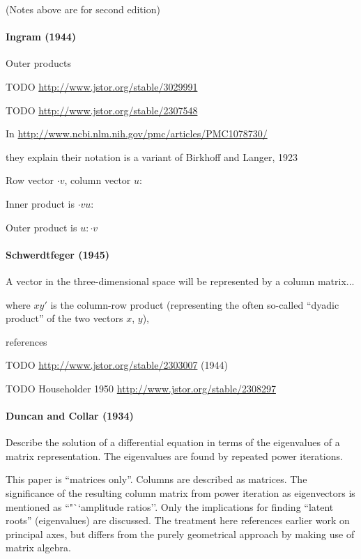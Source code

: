(Notes above are for second edition)



\paragraph{Ingram (1944)}

Outer products

TODO \url{http://www.jstor.org/stable/3029991}

TODO \url{http://www.jstor.org/stable/2307548}

In
\url{http://www.ncbi.nlm.nih.gov/pmc/articles/PMC1078730/}

they explain their notation is a variant of Birkhoff and Langer, 1923

Row vector $\cdot v$, column vector $u:$

Inner product is $\cdot v u:$

Outer product is $u:\cdot v$



\paragraph{Schwerdtfeger (1945)~\cite{Schwerdtfeger1945}}

A vector in the three-dimensional space will
be represented by a column matrix...

where $xy'$ is the column-row product (representing
the often so-called ``dyadic product'' of the
two vectors $x$, $y$),

references \cite{Schwerdtfeger1938,Murnaghan1938,Pipes1937}

TODO \url{http://www.jstor.org/stable/2303007} (1944)

TODO Householder 1950 \url{http://www.jstor.org/stable/2308297}

\paragraph{Duncan and Collar (1934)\cite{Duncan1934}}

Describe the solution of a differential equation in terms of the eigenvalues of
a matrix representation. The eigenvalues are found by repeated power iterations.

This paper is ``matrices only''. Columns are described as matrices.
The significance of the resulting column matrix from power iteration as
eigenvectors is mentioned as ``"``amplitude ratios''.
Only the implications for finding ``latent roots'' (eigenvalues) are discussed.
The treatment here references earlier work on principal axes, but differs from
the purely geometrical approach by making use of matrix algebra.

